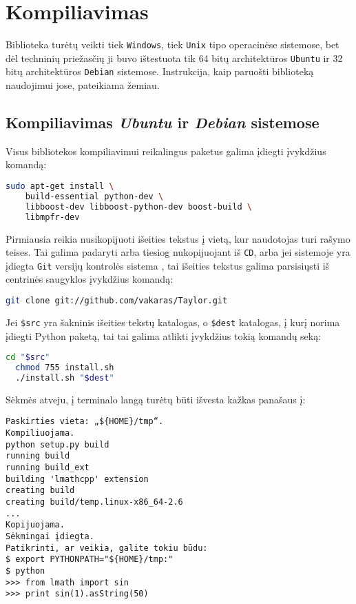 \chapter{Kompiliavimas}

Biblioteka turėtų veikti tiek \verb|Windows|, tiek 
\verb|Unix| tipo operacinėse sistemose, bet dėl techninių priežasčių
ji buvo ištestuota tik 64 bitų architektūros \verb|Ubuntu| ir 32 bitų
architektūros \verb|Debian| sistemose. Instrukcija, kaip paruošti 
biblioteką naudojimui jose, pateikiama žemiau.

\section{Kompiliavimas \emph{Ubuntu} ir \emph{Debian} sistemose}

Visus bibliotekos kompiliavimui reikalingus paketus galima įdiegti 
įvykdžius komandą:
\begin{lstlisting}[language=bash]
  sudo apt-get install \
    build-essential python-dev \
    libboost-dev libboost-python-dev boost-build \
    libmpfr-dev
\end{lstlisting}

Pirmiausia reikia nusikopijuoti išeities tekstus į vietą, kur naudotojas
turi rašymo teises. Tai galima padaryti arba tiesiog nukopijuojant
iš \verb|CD|, arba jei sistemoje yra įdiegta \verb|Git| versijų kontrolės
sistema \cite{git}, tai išeities tekstus galima parsisiųsti iš centrinės
saugyklos įvykdžius komandą:

\begin{lstlisting}[language=bash]
  git clone git://github.com/vakaras/Taylor.git  
\end{lstlisting}

Jei \verb|$src| yra šakninis išeities tekstų katalogas, o \verb|$dest|
katalogas, į kurį norima įdiegti Python paketą, tai tai galima 
atlikti įvykdžius tokią komandų seką:

\begin{lstlisting}[language=bash]
  cd "$src"
  chmod 755 install.sh
  ./install.sh "$dest"
\end{lstlisting}

Sėkmės atveju, į terminalo langą turėtų būti išvesta kažkas panašaus į:
\begin{verbatim}
Paskirties vieta: „${HOME}/tmp“.
Kompiliuojama.
python setup.py build
running build
running build_ext
building 'lmathcpp' extension
creating build
creating build/temp.linux-x86_64-2.6
...
Kopijuojama.
Sėkmingai įdiegta.
Patikrinti, ar veikia, galite tokiu būdu:
$ export PYTHONPATH="${HOME}/tmp:"
$ python
>>> from lmath import sin
>>> print sin(1).asString(50)
\end{verbatim}

